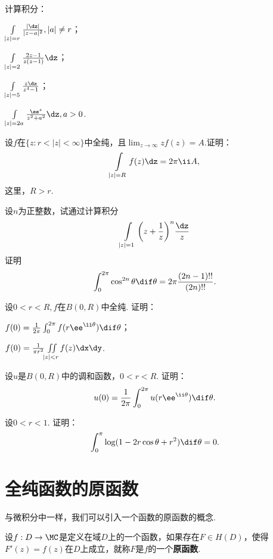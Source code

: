 \begin{xiti}
\item 计算积分：
\begin{enuma}
  \item $\int\limits_{|z|=r}\frac{|\dz|}{|z-a|^2},|a|\ne r$；
  \item $\int\limits_{|z|=2}\frac{2z-1}{z(z-1)}\dz$；
  \item $\int\limits_{|z|=5}\frac{z\dz}{z^4-1}$；
  \item $\int\limits_{|z|=2a}\frac{\ee^z}{z^2+a^2}\dz,a>0$.
\end{enuma}
\item 设$f$在$\{z:r<|z|<\infty\}$中全纯，且$\lim_{z\to\infty}zf(z)=A$.证明：
\[\int\limits_{|z|=R}f(z)\dz=2\pi\ii A,\]
这里，$R>r$.
\item 设$n$为正整数，试通过计算积分
\[\int\limits_{|z|=1}\bigg(z+\frac1z\bigg)^n\frac{\dz}z\]
证明
\[\int_0^{2\pi}\cos^{2n}\theta\dif \theta=2\pi\frac{(2n-1)!!}{(2n)!!}.\]
\item 设$0<r<R,f$在$B(0,R)$中全纯. 证明：
\begin{enuma}
  \item $f(0)=\frac1{2\pi}\int_0^{2\pi}f(r\ee^{\ii\theta})\dif \theta$；
  \item $f(0)=\frac1{\pi r^2}\iint\limits_{|z|<r}f(z)\dx\dy$.
\end{enuma}
\item 设$u$是$B(0,R)$中的调和函数，$0<r<R$. 证明：
\[u(0)=\frac1{2\pi}\int_0^{2\pi}u(r\ee^{\ii\theta})\dif \theta.\]
\item 设$0<r<1$. 证明：
\[\int_0^\pi\log(1-2r\cos\theta+r^2)\dif \theta=0.\]
\end{xiti}

\section{全纯函数的原函数\label{sec3.3}}
与微积分中一样，我们可以引入一个函数的原函数的概念.
\begin{definition}\label{def3.3.1}
设$f:D\to\MC$是定义在域$D$上的一个函数，如果存在$F\in H(D)$，使得$F'(z)=f(z)$在$D$上成立，就称$F$是$f$的一个\textbf{原函数}.
\end{definition}

